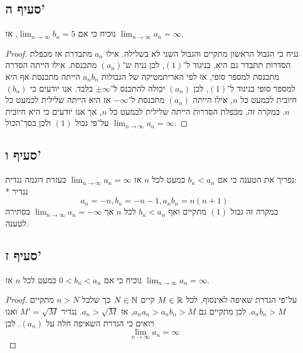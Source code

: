 \subsection{סעיף ה'}
נוכיח כי אם $\lim_{n \to \infty} b_n = 5$, אז $\lim_{n \to \infty} a_n = \infty$.
\begin{proof}
	נניח כי הגבול הראשון מתקיים והגבול השני לא בשלילה.
	אילו $a_n$ מתבדרת אז מכפלת הסדרות תתבדר גם היא, בניגוד ל־$(1)$, לכן נניח ש־$(a_n)$ מתכנסת.
	אילו הייתה הסדרה מתכנסת למספר סופי, אז לפי האריתמטיקה של הגבולות $a_n b_n$ הייתה מתכנסת אף היא למספר סופי בניגוד ל־$(1)$,
	לכן $(a_n)$ יכולה להתכנס ל־$\pm \infty$ בלבד.
	אנו יודעים כי $(b_n)$ חיובית לכמעט כל $n$, אילו הייתה $(a_n)$ מתכנסת ל־$-\infty$ אז היא הייתה שלילית לכמעט כל $n$.
	במקרה זה, מכפלת הסדרות הייתה שלילית לכמעט כל $n$, אך אנו יודעים כי היא חיובית על־פי גבול $(1)$ ולכן בסך־הכול $\lim_{n \to \infty} a_n = \infty$.
\end{proof}

\subsection{סעיף ו'}
נפריך את הטענה כי אם $b_n < a_n$ כמעט לכל $n$ אז $\lim_{n \to \infty} a_n = \infty$ בעזרת דוגמה נגדית: \\*
נגדיר
\[
	a_n = -n, b_n = -n - 1, a_n b_n = n (n + 1)
\]
במקרה זה גבול $(1)$ מתקיים ואף $b_n < a_n$ לכל $n$ אך $\lim_{n \to \infty} a_n = -\infty$ בסתירה לטענה.

\subsection{סעיף ז'}
נוכיח כי אם $0 < b_n < a_n$ כמעט לכל $n$ אז $\lim_{n \to \infty} a_n = \infty$.
\begin{proof}
	על־פי הגדרת שאיפה לאינסוף, לכל $M \in \mathbb{R}$ קיים $N \in \mathbb{N}$ כך שלכל $n > N$ מתקיים $a_n b_n > M$.
	לכן מתקיים גם $a_n a_n > a_n b_n > M$, אז $a_n > \sqrt{M}$. נגדיר $M' = \sqrt{M}$ ואנו רואים כי הגדרת השאיפה חלה על $(a_n)$.
	לכן
	\[
		\lim_{n \to \infty} a_n = \infty
	\]
\end{proof}


